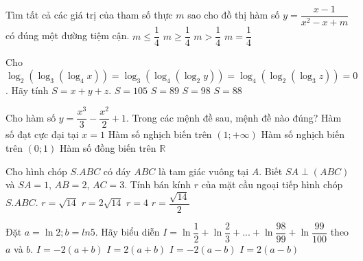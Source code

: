 \begin{ex}%
	Tìm tất cả các giá trị của tham số thực $m$ sao cho đồ thị hàm số $y=\dfrac{x-1}{x^2-x+m}$ có đúng một đường tiệm cận.
	\choice
	{$m\leq \dfrac{1}{4}$}
	{$m\geq \dfrac{1}{4}$}
	{\True $m>\dfrac{1}{4}$}
	{$m=\dfrac{1}{4}$}
\end{ex}


\begin{ex}%
	Cho $\log_2\left(\log_3\left(\log_4x\right)\right)=\log_3\left(\log_4\left(\log_2y\right)\right)=\log_4\left(\log_2\left(\log_3z\right)\right)=0$. Hãy tính $S=x+y+z$.
	\choice
	{$S=105$}
	{\True $S=89$}
	{$S=98$}
	{$S=88$}
\end{ex}

\begin{ex}%
	Cho hàm số $y=\dfrac{x^3}{3}-\dfrac{x^2}{2}+1$. Trong các mệnh đề sau, mệnh đề nào đúng?
	\choice
	{Hàm số đạt cực đại tại $x=1$}
	{Hàm số nghịch biến trên $(1; +\infty)$}
	{\True Hàm số nghịch biến trên $(0; 1)$}
	{Hàm số đồng biến trên $\mathbb{R}$}
\end{ex}


\begin{ex}%
	Cho hình chóp $S.ABC$ có đáy $ABC$ là tam giác vuông tại $A$. Biết $SA\perp (ABC)$ và $SA=1$, $AB=2$, $AC=3$. Tính bán kính $r$ của mặt cầu ngoại tiếp hình chóp $S.ABC$.
	\choice
	{$r=\sqrt{14}$}
	{$r=2\sqrt{14}$}
	{$r=4$}
	{\True $r=\dfrac{\sqrt{14}}{2}$}
\end{ex}


\begin{ex}%
	Đặt $a=\ln 2; b=ln 5$. Hãy biểu diễn $I=\ln\dfrac{1}{2}+\ln\dfrac{2}{3}+...+\ln\dfrac{98}{99}+\ln\dfrac{99}{100}$ theo $a$ và $b$.
	\choice
	{\True $I=-2(a+b)$}
	{$I=2(a+b)$}
	{$I=-2(a-b)$}
	{$I=2(a-b)$}
\end{ex}


